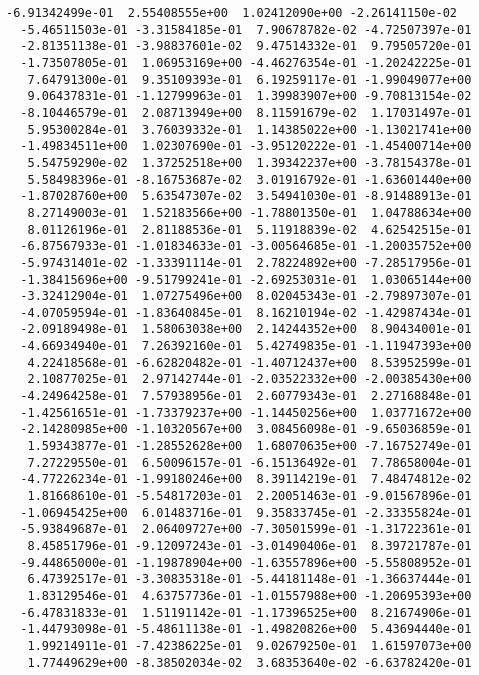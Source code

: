 \documentclass[11pt]{article}
\begin{document}
\begin{Verbatim}[commandchars=\\\{\}]
  -6.91342499e-01  2.55408555e+00  1.02412090e+00 -2.26141150e-02
  -5.46511503e-01 -3.31584185e-01  7.90678782e-02 -4.72507397e-01
  -2.81351138e-01 -3.98837601e-02  9.47514332e-01  9.79505720e-01
  -1.73507805e-01  1.06953169e+00 -4.46276354e-01 -1.20242225e-01
   7.64791300e-01  9.35109393e-01  6.19259117e-01 -1.99049077e+00
   9.06437831e-01 -1.12799963e-01  1.39983907e+00 -9.70813154e-02
  -8.10446579e-01  2.08713949e+00  8.11591679e-02  1.17031497e-01
   5.95300284e-01  3.76039332e-01  1.14385022e+00 -1.13021741e+00
  -1.49834511e+00  1.02307690e-01 -3.95120222e-01 -1.45400714e+00
   5.54759290e-02  1.37252518e+00  1.39342237e+00 -3.78154378e-01
   5.58498396e-01 -8.16753687e-02  3.01916792e-01 -1.63601440e+00
  -1.87028760e+00  5.63547307e-02  3.54941030e-01 -8.91488913e-01
   8.27149003e-01  1.52183566e+00 -1.78801350e-01  1.04788634e+00
   8.01126196e-01  2.81188536e-01  5.11918839e-02  4.62542515e-01
  -6.87567933e-01 -1.01834633e-01 -3.00564685e-01 -1.20035752e+00
  -5.97431401e-02 -1.33391114e-01  2.78224892e+00 -7.28517956e-01
  -1.38415696e+00 -9.51799241e-01 -2.69253031e-01  1.03065144e+00
  -3.32412904e-01  1.07275496e+00  8.02045343e-01 -2.79897307e-01
  -4.07059594e-01 -1.83640845e-01  8.16210194e-02 -1.42987434e-01
  -2.09189498e-01  1.58063038e+00  2.14244352e+00  8.90434001e-01
  -4.66934940e-01  7.26392160e-01  5.42749835e-01 -1.11947393e+00
   4.22418568e-01 -6.62820482e-01 -1.40712437e+00  8.53952599e-01
   2.10877025e-01  2.97142744e-01 -2.03522332e+00 -2.00385430e+00
  -4.24964258e-01  7.57938956e-01  2.60779343e-01  2.27168848e-01
  -1.42561651e-01 -1.73379237e+00 -1.14450256e+00  1.03771672e+00
  -2.14280985e+00 -1.10320567e+00  3.08456098e-01 -9.65036859e-01
   1.59343877e-01 -1.28552628e+00  1.68070635e+00 -7.16752749e-01
   7.27229550e-01  6.50096157e-01 -6.15136492e-01  7.78658004e-01
  -4.77226234e-01 -1.99180246e+00  8.39114219e-01  7.48474812e-02
   1.81668610e-01 -5.54817203e-01  2.20051463e-01 -9.01567896e-01
  -1.06945425e+00  6.01483716e-01  9.35833745e-01 -2.33355824e-01
  -5.93849687e-01  2.06409727e+00 -7.30501599e-01 -1.31722361e-01
   8.45851796e-01 -9.12097243e-01 -3.01490406e-01  8.39721787e-01
  -9.44865000e-01 -1.19878904e+00 -1.63557896e+00 -5.55808952e-01
   6.47392517e-01 -3.30835318e-01 -5.44181148e-01 -1.36637444e-01
   1.83129546e-01  4.63757736e-01 -1.01557988e+00 -1.20695393e+00
  -6.47831833e-01  1.51191142e-01 -1.17396525e+00  8.21674906e-01
  -1.44793098e-01 -5.48611138e-01 -1.49820826e+00  5.43694440e-01
   1.99214911e-01 -7.42386225e-01  9.02679250e-01  1.61597073e+00
   1.77449629e+00 -8.38502034e-02  3.68353640e-02 -6.63782420e-01

\end{Verbatim}
\end{document}
